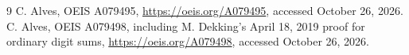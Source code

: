 \documentclass[10pt]{article}
\begin{document}
\begin{thebibliography}{9}
 C. Alves, OEIS A079495,
\url{https://oeis.org/A079495}, accessed October 26, 2026.
 C. Alves, OEIS A079498, including M. Dekking's
April 18, 2019 proof for ordinary digit sums,
\url{https://oeis.org/A079498}, accessed October 26, 2026.
\end{thebibliography}
\end{document}
